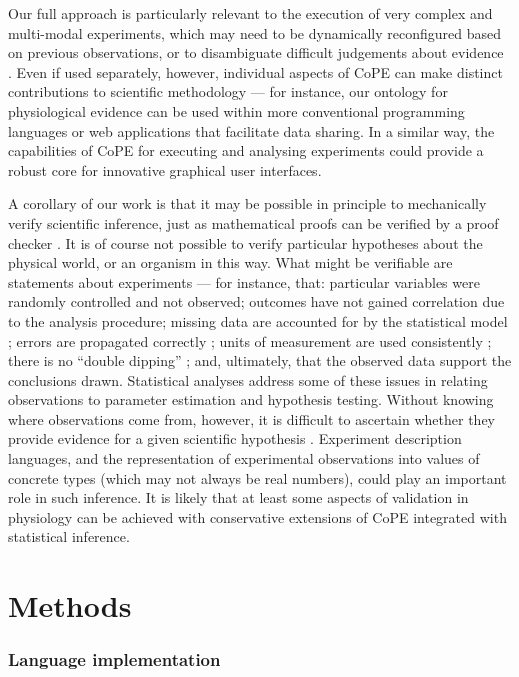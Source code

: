 Our full approach is particularly relevant to the execution of very
complex and multi-modal experiments, which may need to be dynamically
reconfigured based on previous observations, or to disambiguate
difficult judgements about evidence \citep{Kriegeskorte2009}. Even
if used separately, however, individual aspects of CoPE can make
distinct contributions to scientific methodology — for instance, our
ontology for physiological evidence can be used within more
conventional programming languages or web applications that facilitate
data sharing. In a similar way, the capabilities of CoPE for executing
and analysing experiments could provide a robust core for innovative
graphical user interfaces.

A corollary of our work is that it may be possible in principle to
mechanically verify scientific inference, just as mathematical proofs
can be verified by a proof checker \citep{DeBruijn1968,
  Harrison2009}. It is of course not possible to verify particular
hypotheses about the physical world, or an organism in this way. What
might be verifiable are statements about experiments --- for instance,
that: particular variables were randomly controlled and not observed;
outcomes have not gained correlation due to the analysis procedure;
missing data are accounted for by the statistical model
\citep{Gelman2003}; errors are propagated correctly \citep{Taylor1997};
units of measurement are used consistently \citep{Kennedy1997}; there
is no ``double dipping'' \citep{Kriegeskorte2009}; and, ultimately,
that the observed data support the conclusions drawn. Statistical
analyses address some of these issues in relating observations to
parameter estimation and hypothesis testing. Without knowing
where observations come from, however, it is difficult to ascertain whether
they provide evidence for a given scientific hypothesis
\citep{Pool2002}. Experiment description languages, and the
representation of experimental observations into values of concrete
types (which may not always be real numbers), could play an important
role in such inference. It is likely that at least some aspects of
validation in physiology can be achieved with conservative extensions
of
CoPE integrated with statistical inference.

\section*{Methods}

\subsubsection*{Language implementation} 

